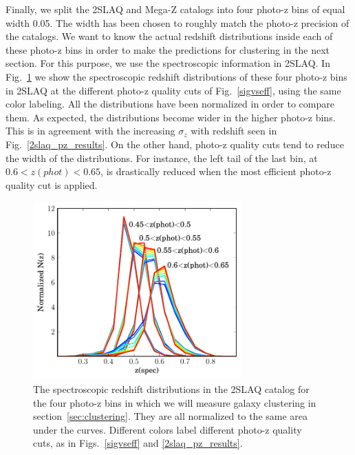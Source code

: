 Finally, we split the 2SLAQ and Mega-Z catalogs into four photo-z bins of equal width 0.05. The width has been chosen to roughly match the photo-z precision of the catalogs. We want to know the actual redshift distributions inside each of these photo-z bins in order to make the predictions for clustering in the next section. For this purpose, we use the spectroscopic information in 2SLAQ. In Fig.~\ref{Nz_bins} we show the spectroscopic redshift distributions of these four photo-z bins in 2SLAQ at the different photo-z quality cuts of Fig.~\ref{sigvseff}, using the same color labeling. All the distributions have been normalized in order to compare them. As expected, the distributions become wider in the higher photo-z bins. This is in agreement with the increasing $\sigma_z$ with redshift seen in Fig.~\ref{2slaq_pz_results}. On the other hand, photo-z quality cuts tend to reduce the width of the distributions. For instance, the left tail of the last bin, at $0.6<z(phot)<0.65$, is drastically reduced when the most efficient photo-z quality cut is applied. 
\begin{figure}
\centering
\includegraphics[width=80mm]{./plots/Nz_bins_megaz.pdf}
\caption{The spectroscopic redshift distributions in the 2SLAQ catalog for the four photo-z bins in which we will measure galaxy clustering in section~\ref{sec:clustering}. They are all normalized to the same area under the curves. Different colors label different photo-z quality cuts, as in Figs.~\ref{sigvseff} and \ref{2slaq_pz_results}.}
\label{Nz_bins}
\end{figure}
